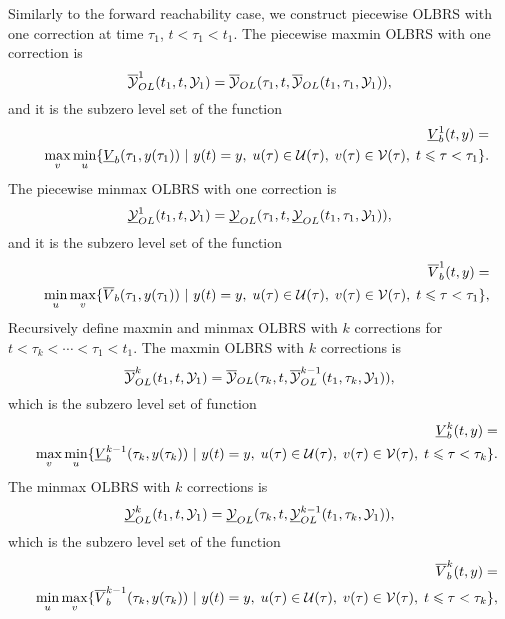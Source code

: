 Similarly to the forward reachability case, we construct piecewise
OLBRS with one correction at time $\tau_1$, $t<\tau_1<t_1$.
The piecewise maxmin OLBRS with one correction is
\begin{equation}
\OYOL^1(t_1, t, \YY_1) = \OYOL(\tau_1, t, \OYOL(t_1, \tau_1, \YY_1)),
\label{maxminb1}
\end{equation}
and it is the subzero level set of the function
\begin{eqnarray}
&&\underline{V}^1_b(t, y) = \nonumber \\
&&\max_v\min_u\{\underline{V}_b(\tau_1, y(\tau_1)) ~|~
y(t)=y, \; u(\tau)\in\UU(\tau), \;
v(\tau)\in\VV(\tau), \; t\leq\tau<\tau_1\}.
\label{maxminvfb1}
\end{eqnarray}
The piecewise minmax OLBRS with one correction is
\begin{equation}
\UYOL^1(t_1, t, \YY_1) = \UYOL(\tau_1, t, \UYOL(t_1, \tau_1, \YY_1)),
\label{minmaxb1}
\end{equation}
and it is the subzero level set of the function
\begin{eqnarray}
&&\overline{V}^1_b(t, y) = \nonumber \\
&&\min_u\max_v\{\overline{V}_b(\tau_1, y(\tau_1)) ~|~
y(t)=y, \; u(\tau)\in\UU(\tau), \;
v(\tau)\in\VV(\tau), \; t\leq\tau<\tau_1\},
\label{minmaxvfb1}
\end{eqnarray}
Recursively define maxmin and minmax OLBRS with $k$ corrections for
$t<\tau_k<\cdots<\tau_1<t_1$.
The maxmin OLBRS with $k$ corrections is
\begin{equation}
\OYOL^k(t_1, t, \YY_1) = \OYOL(\tau_k, t, \OYOL^{k-1}(t_1, \tau_k, \YY_1)),
\label{maxminbk}
\end{equation}
which is the subzero level set of function
\begin{eqnarray}
&&\underline{V}^k_b(t, y) = \nonumber \\
&&\max_v\min_u\{\underline{V}^{k-1}_b(\tau_k, y(\tau_k)) ~|~
y(t)=y, \; u(\tau)\in\UU(\tau), \;
v(\tau)\in\VV(\tau), \; t\leq\tau<\tau_k\}.
\label{maxminvfbk}
\end{eqnarray}
The minmax OLBRS with $k$ corrections is
\begin{equation}
\UYOL^k(t_1, t, \YY_1) = \UYOL(\tau_k, t, \UYOL^{k-1}(t_1, \tau_k, \YY_1)),
\label{minmaxbk}
\end{equation}
which is the subzero level set of the function
\begin{eqnarray}
&&\overline{V}^k_b(t, y) = \nonumber \\
&&\min_u\max_v\{\overline{V}^{k-1}_b(\tau_k, y(\tau_k)) ~|~
y(t)=y, \; u(\tau)\in\UU(\tau), \;
v(\tau)\in\VV(\tau), \; t\leq\tau<\tau_k\},
\label{minmaxvfbk}
\end{eqnarray}
